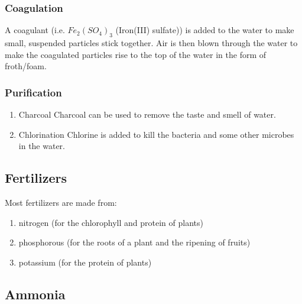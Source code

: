 \documentclass[11pt]{article}
\begin{document}
\subsubsection{Coagulation}
\label{sec:orgd25ddcc}
A coagulant (i.e. \(Fe_2(SO_4)_3\) (Iron(III) sulfate)) is added to the water to make small, suspended particles stick together. Air is then blown through the water to make the coagulated particles rise to the top of the water in the form of froth/foam.
\subsubsection{Purification}
\label{sec:org1f5cb35}
\begin{enumerate}
\item Charcoal
\label{sec:org8269c83}
Charcoal can be used to remove the taste and smell of water.
\item Chlorination
\label{sec:org61d4e7b}
Chlorine is added to kill the bacteria and some other microbes in the water.
\end{enumerate}
\subsection{Fertilizers}
\label{sec:org28828d6}
Most fertilizers are made from:
\begin{enumerate}
\item nitrogen (for the chlorophyll and protein of plants)
\item phosphorous (for the roots of a plant and the ripening of fruits)
\item potassium (for the protein of plants)
\end{enumerate}
\subsection{Ammonia}
\label{sec:org228bbda}
\end{document}
